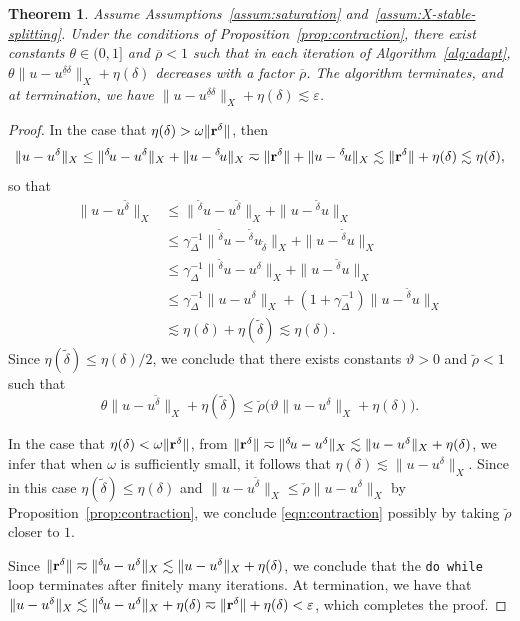 \documentclass[11pt,a4paper,oneside,english]{amsart}
\numberwithin{equation}{section}
\newtheorem{theorem}{Theorem}
\numberwithin{theorem}{section}
\theoremstyle{definition}
\newcommand{\eps}{\varepsilon}
\newcommand{\udelta}{{\underline{\delta}}}
\newcommand{\jw}[1]{{\color{red}{JW: #1}}}
\begin{document}
\begin{theorem}
  Assume Assumptions~\ref{assum:saturation} and~\ref{assum:X-stable-splitting}.
  Under the conditions of Proposition~\ref{prop:contraction},
  there exist constants $\theta \in (0,1]$ and $\overline \rho < 1$ such that
  in each iteration of Algorithm~\ref{alg:adapt}, $\theta\|u - u^{\udelta \delta}\|_X + \eta(\delta)$
  decreases with a factor $\overline \rho$. The algorithm terminates, and at termination,
  we have $\|u - u^{\udelta \delta}\|_X + \eta(\delta) \lesssim \eps$.
\end{theorem}
\begin{proof}
  \jw{dit bewijs heb ik nog niet nagelopen.}
  In the case that $\eta(\delta)>\omega \|{\bf r}^\delta\|$, then
  \[
    \|u-u^\delta\|_X \leq \|{}^{\delta\!}u-u^\delta\|_X+\|u-{}^{\delta\!}u\|_X \eqsim \|{\bf r}^\delta\|+\|u-{}^{\delta\!}u\|_X \lesssim \|{\bf r}^\delta\|+\eta(\delta) \lesssim \eta(\delta),
  \]
  so that
  \begin{align*}
    \|u-u^{\tilde{\delta}}\|_X &\leq \|{}^{\tilde{\delta}\!}u-u^{\tilde{\delta}}\|_X+\|u-{}^{\tilde{\delta}\!}u\|_X\\
    &\leq \gamma_\Delta^{-1}\|{}^{\tilde{\delta}\!}u-{}^{\tilde{\delta}\!}u_{\tilde{\delta}}\|_X+\|u-{}^{\tilde{\delta}\!}u\|_X\\
    &\leq \gamma_\Delta^{-1}\|{}^{\tilde{\delta}\!}u-u^\delta\|_X+\|u-{}^{\tilde{\delta}\!}u\|_X\\
    &\leq
    \gamma_\Delta^{-1}\|u-u^\delta\|_X+(1+\gamma_\Delta^{-1})\|u-{}^{\tilde{\delta}\!}u\|_X\\
    & \lesssim \eta(\delta)+\eta(\tilde \delta) \lesssim \eta(\delta).
  \end{align*}
  Since $\eta(\tilde{\delta})\leq \eta(\delta)/2$, we conclude that there exists
  constants $\vartheta>0$ and $\breve{\rho}<1$ such that
  \begin{equation}
    \label{eqn:contraction}
    \theta \|u-u^{\tilde{\delta}}\|_X +\eta(\tilde{\delta}) \leq \breve{\rho}\big(\vartheta \|u-u^{\delta}\|_X +\eta(\delta)\big).
  \end{equation}

  In the case that $\eta(\delta)<\omega \|{\bf r}^\delta\|$, from
  $\|{\bf r}^\delta\| \eqsim \|{}^{\delta\!}u-u^\delta\|_X \lesssim \|u-u^\delta\|_X+\eta(\delta)$,
  we infer that when $\omega$ is sufficiently small, it follows that $\eta(\delta) \lesssim \|u-u^\delta\|_X$.
  Since in this case $\eta(\tilde{\delta})\leq \eta(\delta)$ and 
  $\|u-u^{\tilde{\delta}}\|_X \leq \check{\rho} \|u-u^\delta\|_X$ by Proposition~\ref{prop:contraction},
  we conclude \eqref{eqn:contraction} possibly by taking $\breve{\rho}$ closer to $1$.

  Since $\|{\bf r}^\delta\| \eqsim \|{}^{\delta\!}u-u^\delta\|_X \lesssim \|u-u^\delta\|_X+\eta(\delta)$,
  we conclude that the \texttt{do while} loop terminates after finitely many iterations.
  At termination, we have that
  $\|u-u^\delta\|_X \lesssim \|{}^{\delta\!}u-u^\delta\|_X+\eta(\delta) \eqsim \|{\bf r}^\delta\|+\eta(\delta)<\eps$, which completes the proof.
\end{proof}
\end{document}

